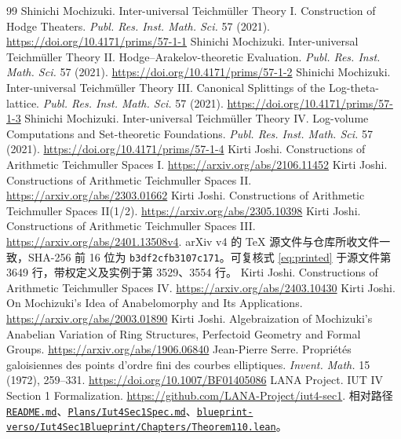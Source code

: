 \documentclass[UTF8,fontset=none,zihao=-4,a4paper]{ctexart}
\newcommand{\lana}[2]{\href{https://github.com/LANA-Project/iut4-sec1/blob/a7551d2f575b7e462cf9e82c587d9c6308e7b15c/#1}{\nolinkurl{#2}}}
\begin{document}
\begingroup
{}\fontsize{10.5bp}{16bp}\selectfont
\renewcommand{\refname}{参考文献}
\setlength{\parskip}{0bp}
\begin{thebibliography}{99}
\setlength{\itemsep}{3bp}
\setlength{\parsep}{0bp}
 Shinichi Mochizuki. Inter-universal Teichmüller Theory I. Construction of Hodge Theaters. \emph{Publ. Res. Inst. Math. Sci.} 57 (2021). \url{https://doi.org/10.4171/prims/57-1-1}
 Shinichi Mochizuki. Inter-universal Teichmüller Theory II. Hodge--Arakelov-theoretic Evaluation. \emph{Publ. Res. Inst. Math. Sci.} 57 (2021). \url{https://doi.org/10.4171/prims/57-1-2}
 Shinichi Mochizuki. Inter-universal Teichmüller Theory III. Canonical Splittings of the Log-theta-lattice. \emph{Publ. Res. Inst. Math. Sci.} 57 (2021). \url{https://doi.org/10.4171/prims/57-1-3}
 Shinichi Mochizuki. Inter-universal Teichmüller Theory IV. Log-volume Computations and Set-theoretic Foundations. \emph{Publ. Res. Inst. Math. Sci.} 57 (2021). \url{https://doi.org/10.4171/prims/57-1-4}
 Kirti Joshi. Constructions of Arithmetic Teichmuller Spaces I. \url{https://arxiv.org/abs/2106.11452}
 Kirti Joshi. Constructions of Arithmetic Teichmuller Spaces II. \url{https://arxiv.org/abs/2303.01662}
 Kirti Joshi. Constructions of Arithmetic Teichmuller Spaces II(1/2). \url{https://arxiv.org/abs/2305.10398}
 Kirti Joshi. Constructions of Arithmetic Teichmuller Spaces III. \url{https://arxiv.org/abs/2401.13508v4}. arXiv v4 的 TeX 源文件与仓库所收文件一致，SHA-256 前 16 位为 \nolinkurl{b3df2cfb3107c171}。可复核式 \eqref{eq:printed} 于源文件第 3649 行，带权定义及实例于第 3529、3554 行。
 Kirti Joshi. Constructions of Arithmetic Teichmuller Spaces IV. \url{https://arxiv.org/abs/2403.10430}
 Kirti Joshi. On Mochizuki's Idea of Anabelomorphy and Its Applications. \url{https://arxiv.org/abs/2003.01890}
 Kirti Joshi. Algebraization of Mochizuki's Anabelian Variation of Ring Structures, Perfectoid Geometry and Formal Groups. \url{https://arxiv.org/abs/1906.06840}
 Jean-Pierre Serre. Propriétés galoisiennes des points d'ordre fini des courbes elliptiques. \emph{Invent. Math.} 15 (1972), 259--331. \url{https://doi.org/10.1007/BF01405086}
 LANA Project. IUT IV Section 1 Formalization. \url{https://github.com/LANA-Project/iut4-sec1}. 相对路径 \lana{README.md}{README.md}、\lana{Plans/Iut4Sec1Spec.md}{Plans/Iut4Sec1Spec.md}、\lana{blueprint-verso/Iut4Sec1Blueprint/Chapters/Theorem110.lean}{blueprint-verso/Iut4Sec1Blueprint/Chapters/Theorem110.lean}。

\end{thebibliography}
\end{document}
